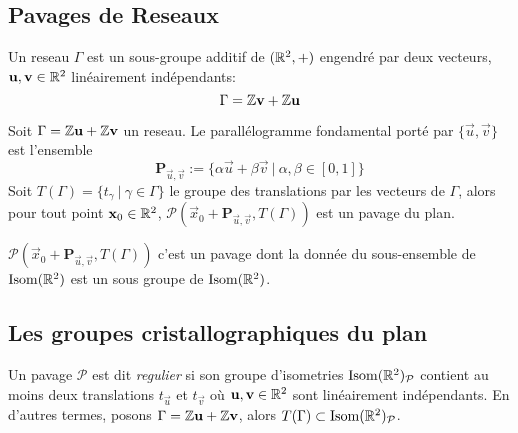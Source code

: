 \subsection{Pavages de Reseaux}

\begin{definition}
	Un reseau $\Gamma$ est un sous-groupe additif de $(\mathbb{R}^2, +)$
	engendré par deux vecteurs, $\mathbf{u}, \mathbf{v} \in \mathbb{R}^2$ linéairement
	indépendants:
	\begin{equation*}
		\Gamma = \mathbb{Z}\mathbf{v} + \mathbb{Z}\mathbf{u}
	\end{equation*}
\end{definition}

\begin{definition}
	Soit $\Gamma = \mathbb{Z}\mathbf{u} + \mathbb{Z}\mathbf{v}$ un reseau. Le parallélogramme
	fondamental porté par $\{\vec{u}, \vec{v}\}$ est l'ensemble
	\begin{equation*}
		\mathbf{P}_{\vec{u},\vec{v}} :=
		\{\alpha\vec{u} + \beta\vec{v}\ |\ \alpha, \beta \in [0, 1]\}
	\end{equation*}
	Soit $T(\Gamma) = \{t_\gamma\ |\ \gamma \in \Gamma\}$ le groupe des
	translations par les vecteurs de $\Gamma$, alors pour tout point
	$\mathbf{x}_0 \in \mathbb{R}^2$,
	$\mathcal{P}(\vec{x}_0 + \mathbf{P}_{\vec{u},\vec{v}}, T(\Gamma))$
	est un pavage du plan.
\end{definition}

\begin{remark}
	$\mathcal{P}(\vec{x}_0 + \mathbf{P}_{\vec{u},\vec{v}}, T(\Gamma))$
	c'est un pavage dont la donnée du sous-ensemble de $\operatorname{Isom}(\mathbb{R}^2)$ est un sous
	groupe de $\operatorname{Isom}(\mathbb{R}^2)$.
\end{remark}

\subsection{Les groupes cristallographiques du plan}

\begin{definition}
	Un pavage $\mathcal{P}$ est dit \emph{regulier} si son groupe d'isometries
	$\operatorname{Isom}(\mathbb{R}^2)_\mathcal{P}$ contient au moins deux translations $t_\vec{u}$ et
	$t_\vec{v}$ où $\mathbf{u}, \mathbf{v} \in \mathbb{R}^2$ sont linéairement indépendants. En
	d'autres termes, posons $\Gamma = \mathbb{Z}\mathbf{u} + \mathbb{Z}\mathbf{v}$, alors
	$T(\Gamma)\subset \operatorname{Isom}(\mathbb{R}^2)_\mathcal{P}$.
\end{definition}

